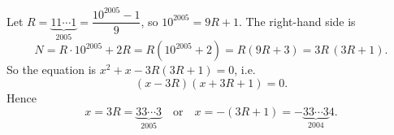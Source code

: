 Let $R=\underbrace{11\cdots1}_{2005}=\dfrac{10^{2005}-1}{9}$, so $10^{2005}=9R+1$. The right-hand side is
\[N=R\cdot10^{2005}+2R=R\left(10^{2005}+2\right)=R(9R+3)=3R\,(3R+1).\]
So the equation is $x^2+x-3R(3R+1)=0$, i.e.
\[(x-3R)(x+3R+1)=0.\]
Hence
\[\boxed{x=3R=\underbrace{33\cdots3}_{2005}\quad\text{or}\quad x=-(3R+1)=-\underbrace{33\cdots3}_{2004}4}.\]
